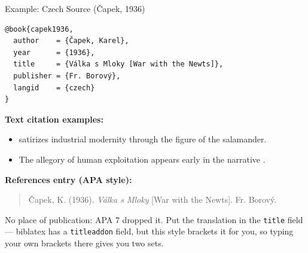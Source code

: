 \documentclass[aspectratio=169]{beamer}
\begin{document}
\begin{frame}[fragile]{Example: Czech Source (Čapek, 1936)}
\small
\begin{verbatim}
@book{capek1936,
  author    = {Čapek, Karel},
  year      = {1936},
  title     = {Válka s Mloky [War with the Newts]},
  publisher = {Fr. Borový},
  langid    = {czech}
}
\end{verbatim}

\textbf{Text citation examples:}
\begin{itemize}
  \item \citet{capek1936} satirizes industrial modernity through the figure of the salamander.
  \item The allegory of human exploitation appears early in the narrative \citep{capek1936}.
\end{itemize}

\textbf{References entry (APA style):}
\begin{quote}
Čapek, K. (1936). \emph{Válka s Mloky} [War with the Newts]. Fr. Borový.
\end{quote}
{\footnotesize No place of publication: APA 7 dropped it.  Put the
translation in the \texttt{title} field --- biblatex has a
\texttt{titleaddon} field, but this style brackets it for you, so typing your
own brackets there gives you two sets.}
\end{frame}
\end{document}

